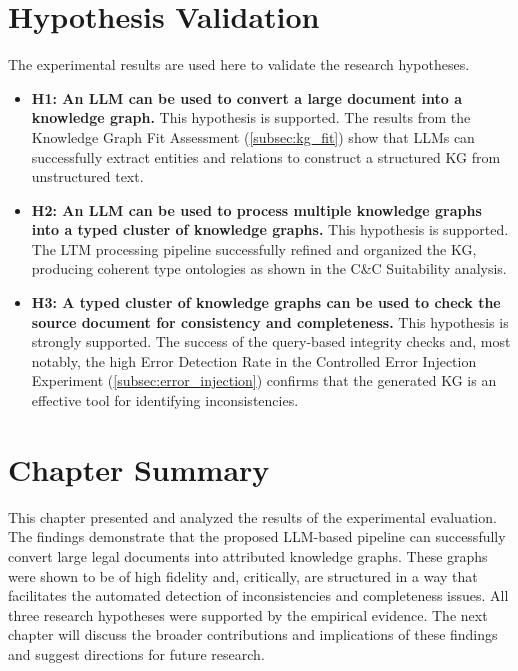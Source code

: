 \section{Hypothesis Validation}
\label{sec:hypothesis_validation}
The experimental results are used here to validate the research hypotheses.
\begin{itemize}
    \item \textbf{H1: An LLM can be used to convert a large document into a knowledge graph.} This hypothesis is supported. The results from the Knowledge Graph Fit Assessment (\cref{subsec:kg_fit}) show that LLMs can successfully extract entities and relations to construct a structured KG from unstructured text.
    \item \textbf{H2: An LLM can be used to process multiple knowledge graphs into a typed cluster of knowledge graphs.} This hypothesis is supported. The LTM processing pipeline successfully refined and organized the KG, producing coherent type ontologies as shown in the C\&C Suitability analysis.
    \item \textbf{H3: A typed cluster of knowledge graphs can be used to check the source document for consistency and completeness.} This hypothesis is strongly supported. The success of the query-based integrity checks and, most notably, the high Error Detection Rate in the Controlled Error Injection Experiment (\cref{subsec:error_injection}) confirms that the generated KG is an effective tool for identifying inconsistencies.
\end{itemize}

\section{Chapter Summary}
\label{sec:results_summary}
This chapter presented and analyzed the results of the experimental evaluation. The findings demonstrate that the proposed LLM-based pipeline can successfully convert large legal documents into attributed knowledge graphs. These graphs were shown to be of high fidelity and, critically, are structured in a way that facilitates the automated detection of inconsistencies and completeness issues. All three research hypotheses were supported by the empirical evidence. The next chapter will discuss the broader contributions and implications of these findings and suggest directions for future research.